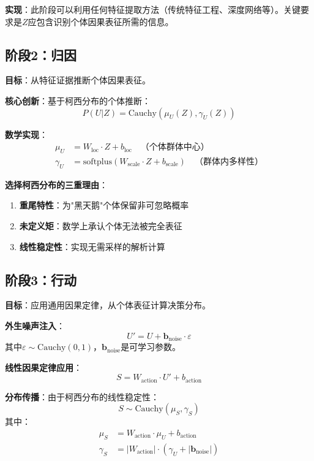 \documentclass[conference]{IEEEtran}
\newcommand{\cauchy}{\text{Cauchy}}
\begin{document}
\begin{CJK}{UTF8}{gbsn}
\textbf{实现}：此阶段可以利用任何特征提取方法（传统特征工程、深度网络等）。关键要求是$Z$应包含识别个体因果表征所需的信息。

\subsection{阶段2：归因}

\textbf{目标}：从特征证据推断个体因果表征。

\textbf{核心创新}：基于柯西分布的个体推断：
\begin{equation}
P(U|Z) = \cauchy(\mu_U(Z), \gamma_U(Z))
\end{equation}

\textbf{数学实现}：
\begin{align}
\mu_U &= W_{\text{loc}} \cdot Z + b_{\text{loc}} \quad \text{（个体群体中心）} \\
\gamma_U &= \text{softplus}(W_{\text{scale}} \cdot Z + b_{\text{scale}}) \quad \text{（群体内多样性）}
\end{align}

\textbf{选择柯西分布的三重理由}：
\begin{enumerate}
\item \textbf{重尾特性}：为"黑天鹅"个体保留非可忽略概率
\item \textbf{未定义矩}：数学上承认个体无法被完全表征  
\item \textbf{线性稳定性}：实现无需采样的解析计算
\end{enumerate}

\subsection{阶段3：行动}

\textbf{目标}：应用通用因果定律，从个体表征计算决策分布。

\textbf{外生噪声注入}：
\begin{equation}
U' = U + \mathbf{b}_{\text{noise}} \cdot \varepsilon
\end{equation}
其中$\varepsilon \sim \cauchy(0, 1)$，$\mathbf{b}_{\text{noise}}$是可学习参数。

\textbf{线性因果定律应用}：
\begin{equation}
S = W_{\text{action}} \cdot U' + b_{\text{action}}
\end{equation}

\textbf{分布传播}：由于柯西分布的线性稳定性：
\begin{equation}
S \sim \cauchy(\mu_S, \gamma_S)
\end{equation}
其中：
\begin{align}
\mu_S &= W_{\text{action}} \cdot \mu_U + b_{\text{action}} \\
\gamma_S &= |W_{\text{action}}| \cdot (\gamma_U + |\mathbf{b}_{\text{noise}}|)
\end{align}


\end{CJK}
\end{document}
